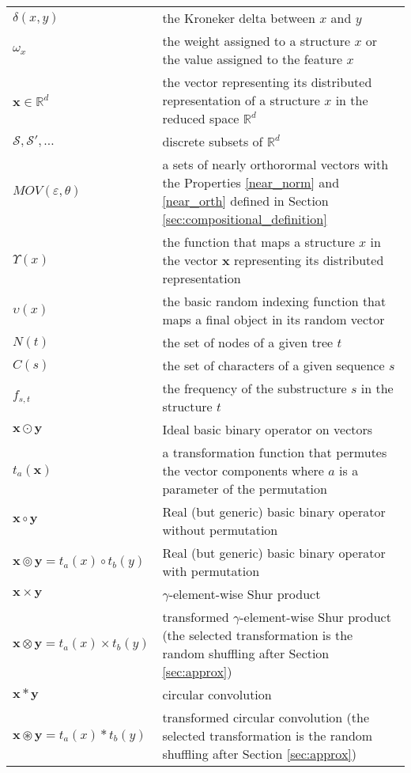 \documentclass[twoside,11pt]{article}
\def\vec#1{\mathbf{#1}}
\def\svec#1{\vec{#1}}
\def\smallvectors#1{\mathcal{#1}}
\def\df{\Upsilon}
\def\basicdf{\upsilon}
\def\mynodes#1{N(#1)}
\def\mychar#1{C(#1)}
\def\num#1#2{f_{#1,#2}}
\def\shuf#1#2{t_{#1}(#2)}
\def\mo{\odot}
\def\rop{\circ}
\def\comp{\circledcirc}
\def\prodmo{\times}
\def\shufprod{\otimes}
\def\cconv{\ast}
\def\shufcconv{\circledast}
\def\mysecondremove#1{}
\def\mysecondinsert#1{#1}
\begin{document}
\begin{small}
\begin{tabular}{lp{10cm}}
$\delta(x,y)$ &  the Kroneker delta between $x$ and $y$\\
$\omega_{x}$ &  the weight assigned to a structure $x$ \mysecondinsert{or the value assigned to the feature $x$}\\
\hline
$\svec{x} \in {\mathbb R}^d$ &  the vector representing its distributed representation of a structure $x$ in the reduced space ${\mathbb R}^d$\\
$\smallvectors{S},\smallvectors{S'}, \ldots$ & discrete subsets of ${\mathbb R}^d$\\
$MOV(\varepsilon,\theta)$ & a sets of nearly orthorormal vectors with the Properties \ref{near_norm} and \ref{near_orth} defined in Section \ref{sec:compositional_definition}
\\
$\df(x)$ &  the function that maps a structure $x$ in the vector $\svec{x}$ representing its distributed representation\\
$\basicdf(x)$ & the basic random indexing function that maps a final object in its random vector\\
\hline
$\mynodes{t}$ & the set of nodes of a given tree $t$\\
$\mychar{s}$ & the set of characters of a given sequence $s$\\
\hline
$\num{s}{t}$ & the frequency of the substructure $s$ in the structure $t$\\
\hline
$\svec{x}\mo\svec{y}$     & Ideal basic \mysecondinsert{binary}\mysecondremove{vector composition} operator \mysecondinsert{on vectors}\\
$\shuf{a}{\svec{x}}$ & a transformation function that permutes the vector components where $a$ is a parameter of the permutation\\
$\svec{x}\rop\svec{y}$    & Real (but generic) basic \mysecondinsert{binary}\mysecondremove{vector composition} operator without permutation \\
$\svec{x}\comp\svec{y}=\shuf{a}{x}\rop\shuf{b}{y}$ &  Real (but generic) basic \mysecondinsert{binary}\mysecondremove{vector composition} operator  with permutation \\
$\svec{x}\prodmo\svec{y}$ & $\gamma$-element-wise Shur product\\
$\svec{x}\shufprod\svec{y}=\shuf{a}{x}\prodmo\shuf{b}{y}$ & transformed  $\gamma$-element-wise Shur product (the selected transformation is the random shuffling after Section \ref{sec:approx}) \\
$\svec{x}\cconv\svec{y}$ & circular convolution\\
$\svec{x}\shufcconv\svec{y}=\shuf{a}{x}\cconv\shuf{b}{y}$ & transformed circular convolution (the selected transformation is the random shuffling after Section \ref{sec:approx})\\
\end{tabular}
\end{small}
\end{document}
